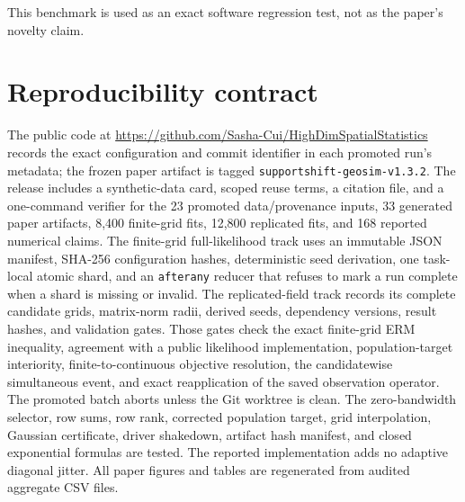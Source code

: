 \documentclass[11pt]{article}
\theoremstyle{remark}
\begin{document}
This benchmark is used as an exact software regression test, not as the paper's
novelty claim.

\section{Reproducibility contract}

The public code at
\url{https://github.com/Sasha-Cui/HighDimSpatialStatistics} records the exact
configuration and commit identifier in each promoted run's metadata; the
frozen paper artifact is tagged
\texttt{supportshift-geosim-v1.3.2}.  The release includes a synthetic-data
card, scoped reuse terms, a citation file, and a one-command verifier for the
23 promoted data/provenance inputs, 33 generated paper artifacts, 8,400
finite-grid fits, 12,800 replicated fits, and 168 reported numerical claims.  The
finite-grid full-likelihood track uses an immutable JSON manifest, SHA-256
configuration hashes, deterministic seed derivation, one task-local atomic
shard, and an \texttt{afterany} reducer that refuses to mark a run complete
when a shard is missing or invalid.  The replicated-field track records its
complete candidate grids, matrix-norm radii, derived seeds, dependency
versions, result hashes, and validation gates.  Those gates check the exact
finite-grid ERM inequality, agreement with a public likelihood implementation,
population-target interiority, finite-to-continuous objective resolution, the
candidatewise simultaneous event, and exact reapplication of the saved
observation operator.  The promoted batch aborts unless the Git worktree is
clean.  The zero-bandwidth selector, row sums, row rank, corrected population
target, grid interpolation, Gaussian certificate, driver shakedown, artifact
hash manifest, and closed exponential formulas are tested.  The reported
implementation adds no adaptive diagonal jitter.  All paper figures and tables
are regenerated from audited aggregate CSV files.

\begingroup
\small
\setlength{\bibsep}{0pt plus 0.2ex}


\endgroup
\end{document}
